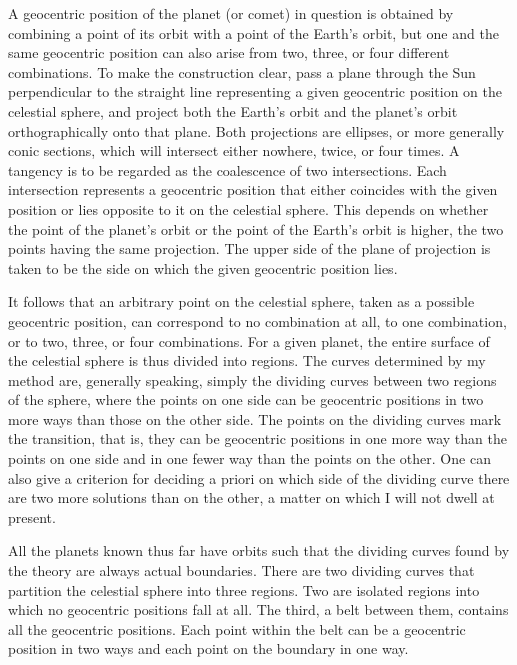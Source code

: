 A geocentric position of the planet (or comet) in question is obtained by combining a point of its orbit with a point of the Earth's orbit, but one and the same geocentric position can also arise from two, three, or four different combinations. To make the construction clear, pass a plane through the Sun perpendicular to the straight line representing a given geocentric position on the celestial sphere, and project both the Earth's orbit and the planet's orbit orthographically onto that plane. Both projections are ellipses, or more generally conic sections, which will intersect either nowhere, twice, or four times. A tangency is to be regarded as the coalescence of two intersections. Each intersection represents a geocentric position that either coincides with the given position or lies opposite to it on the celestial sphere. This depends on whether the point of the planet's orbit or the point of the Earth's orbit is higher, the two points having the same projection. The upper side of the plane of projection is taken to be the side on which the given geocentric position lies.

It follows that an arbitrary point on the celestial sphere, taken as a possible geocentric position, can correspond to no combination at all, to one combination, or to two, three, or four combinations. For a given planet, the entire surface of the celestial sphere is thus divided into regions. The curves determined by my method are, generally speaking, simply the dividing curves between two regions of the sphere, where the points on one side can be geocentric positions in two more ways than those on the
other side. The points on the dividing curves mark the transition, that is, they can be geocentric positions in one more way than the points on one side and in one fewer way than the points on the other. One can also give a criterion for deciding a priori on which side of the dividing curve there are two more solutions than on the other, a matter on which I will not dwell at present\HistoricalNoteEight{See Note 17.]}.

All the planets known thus far have orbits such that the dividing curves found by the theory are always actual boundaries. There are two dividing curves that partition the celestial sphere into three regions. Two are isolated regions into which no geocentric positions fall at all. The third, a belt between them, contains all the geocentric positions. Each point within the belt can be a geocentric position in two ways and each point on the boundary in one way.

